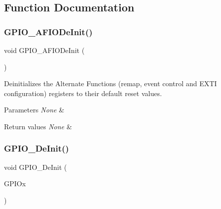 \subsection{Function Documentation}
\mbox{\label{group___g_p_i_o___exported___functions_ga7f645e6b6146818c3d6c19021e70170c}} 
\subsubsection{\texorpdfstring{GPIO\_AFIODeInit()}{GPIO\_AFIODeInit()}}
{\footnotesize\ttfamily void G\+P\+I\+O\+\_\+\+A\+F\+I\+O\+De\+Init (\begin{DoxyParamCaption}\item[{void}]{ }\end{DoxyParamCaption})}



Deinitializes the Alternate Functions (remap, event control and E\+X\+TI configuration) registers to their default reset values. 


\begin{DoxyParams}{Parameters}
{\em None} & \\
\hline
\end{DoxyParams}

\begin{DoxyRetVals}{Return values}
{\em None} & \\
\hline
\end{DoxyRetVals}
\mbox{\label{group___g_p_i_o___exported___functions_gaa60bdf3182c44b5fa818f237042f52ee}} 
\subsubsection{\texorpdfstring{GPIO\_DeInit()}{GPIO\_DeInit()}}
{\footnotesize\ttfamily void G\+P\+I\+O\+\_\+\+De\+Init (\begin{DoxyParamCaption}\item[{\mbox{\hyperlink{struct_g_p_i_o___type_def}{G\+P\+I\+O\+\_\+\+Type\+Def}} $\ast$}]{G\+P\+I\+Ox }\end{DoxyParamCaption})}



